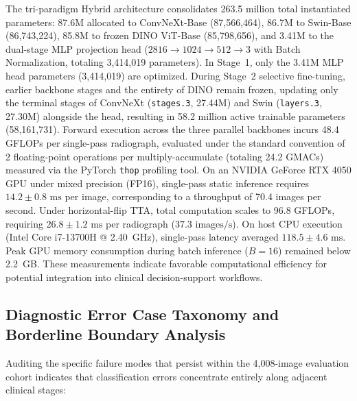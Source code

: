 \documentclass[10pt,journal]{IEEEtran}
\begin{document}
The tri-paradigm Hybrid architecture consolidates 263.5 million total instantiated parameters: 87.6M allocated to ConvNeXt-Base (87,566,464), 86.7M to Swin-Base (86,743,224), 85.8M to frozen DINO ViT-Base (85,798,656), and 3.41M to the dual-stage MLP projection head ($2816 \to 1024 \to 512 \to 3$ with Batch Normalization, totaling 3,414,019 parameters). In Stage~1, only the 3.41M MLP head parameters (3,414,019) are optimized. During Stage~2 selective fine-tuning, earlier backbone stages and the entirety of DINO remain frozen, updating only the terminal stages of ConvNeXt (\texttt{stages.3}, 27.44M) and Swin (\texttt{layers.3}, 27.30M) alongside the head, resulting in 58.2 million active trainable parameters (58,161,731). Forward execution across the three parallel backbones incurs 48.4 GFLOPs per single-pass radiograph, evaluated under the standard convention of 2 floating-point operations per multiply-accumulate (totaling 24.2 GMACs) measured via the PyTorch \texttt{thop} profiling tool. On an NVIDIA GeForce RTX 4050 GPU under mixed precision (FP16), single-pass static inference requires $14.2 \pm 0.8\text{ ms}$ per image, corresponding to a throughput of 70.4 images per second. Under horizontal-flip TTA, total computation scales to 96.8 GFLOPs, requiring $26.8 \pm 1.2\text{ ms}$ per radiograph ($37.3\text{ images/s}$). On host CPU execution (Intel Core i7-13700H @ 2.40~GHz), single-pass latency averaged $118.5 \pm 4.6\text{ ms}$. Peak GPU memory consumption during batch inference ($B=16$) remained below 2.2~GB. These measurements indicate favorable computational efficiency for potential integration into clinical decision-support workflows.

\subsection{Diagnostic Error Case Taxonomy and Borderline Boundary Analysis}
\label{subsec:error_analysis}

Auditing the specific failure modes that persist within the 4,008-image evaluation cohort indicates that classification errors concentrate entirely along adjacent clinical stages:
\end{document}
